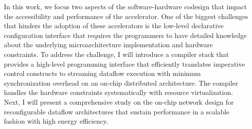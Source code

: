 In this work, we focus two aspects of the software-hardware codesign that impact the accessibility and performance of the accelerator. One of the biggest challenges that hinders the adoption of these accelerators is the low-level declarative configuration interface that requires the programmers to have detailed knowledge about the underlying microarchitecture implementation and hardware constraints. To address the challenge, I will introduce a compiler stack that provides a high-level programming interface that efficiently translates imperative control constructs to streaming dataflow execution with minimum synchronization overhead on an on-chip distributed architecture. The compiler handles the hardware constraints systematically with resource virtualization. Next, I will present a comprehensive study on the on-chip network design for reconfigurable dataflow architectures that sustain performance in a scalable fashion with high energy efficiency.
